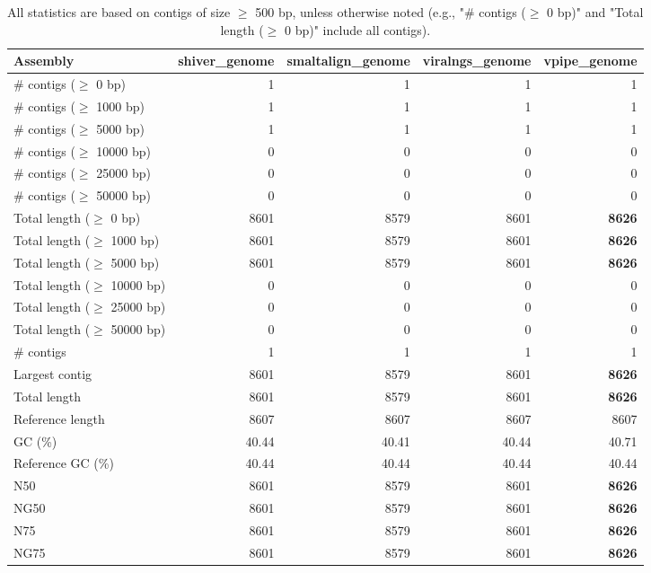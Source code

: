 \documentclass[12pt,a4paper]{article}
\begin{document}
\begin{table}[ht]
\begin{center}
\caption{All statistics are based on contigs of size $\geq$ 500 bp, unless otherwise noted (e.g., "\# contigs ($\geq$ 0 bp)" and "Total length ($\geq$ 0 bp)" include all contigs).}
\begin{tabular}{|l*{4}{|r}|}
\hline
Assembly & shiver\_genome & smaltalign\_genome & viralngs\_genome & vpipe\_genome \\ \hline
\# contigs ($\geq$ 0 bp) & 1 & 1 & 1 & 1 \\ \hline
\# contigs ($\geq$ 1000 bp) & 1 & 1 & 1 & 1 \\ \hline
\# contigs ($\geq$ 5000 bp) & 1 & 1 & 1 & 1 \\ \hline
\# contigs ($\geq$ 10000 bp) & 0 & 0 & 0 & 0 \\ \hline
\# contigs ($\geq$ 25000 bp) & 0 & 0 & 0 & 0 \\ \hline
\# contigs ($\geq$ 50000 bp) & 0 & 0 & 0 & 0 \\ \hline
Total length ($\geq$ 0 bp) & 8601 & 8579 & 8601 & {\bf 8626} \\ \hline
Total length ($\geq$ 1000 bp) & 8601 & 8579 & 8601 & {\bf 8626} \\ \hline
Total length ($\geq$ 5000 bp) & 8601 & 8579 & 8601 & {\bf 8626} \\ \hline
Total length ($\geq$ 10000 bp) & 0 & 0 & 0 & 0 \\ \hline
Total length ($\geq$ 25000 bp) & 0 & 0 & 0 & 0 \\ \hline
Total length ($\geq$ 50000 bp) & 0 & 0 & 0 & 0 \\ \hline
\# contigs & 1 & 1 & 1 & 1 \\ \hline
Largest contig & 8601 & 8579 & 8601 & {\bf 8626} \\ \hline
Total length & 8601 & 8579 & 8601 & {\bf 8626} \\ \hline
Reference length & 8607 & 8607 & 8607 & 8607 \\ \hline
GC (\%) & 40.44 & 40.41 & 40.44 & 40.71 \\ \hline
Reference GC (\%) & 40.44 & 40.44 & 40.44 & 40.44 \\ \hline
N50 & 8601 & 8579 & 8601 & {\bf 8626} \\ \hline
NG50 & 8601 & 8579 & 8601 & {\bf 8626} \\ \hline
N75 & 8601 & 8579 & 8601 & {\bf 8626} \\ \hline
NG75 & 8601 & 8579 & 8601 & {\bf 8626} \\ \hline

\end{tabular}
\end{center}
\end{table}
\end{document}
